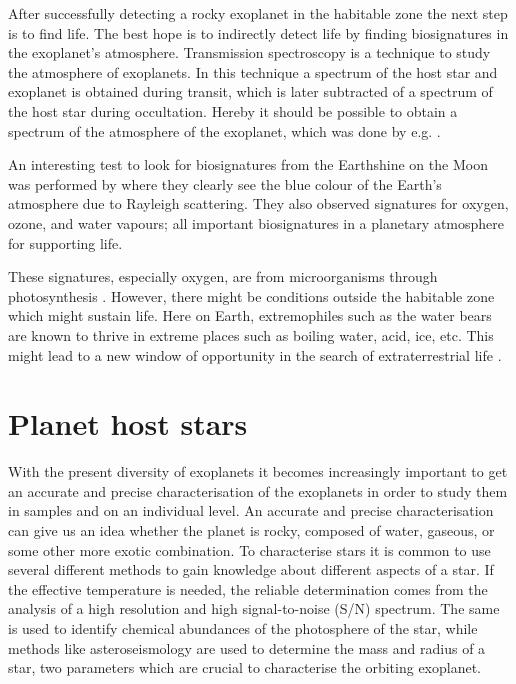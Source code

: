 After successfully detecting a rocky exoplanet in the habitable zone the next step is to find life.
The best hope is to indirectly detect life by finding biosignatures \citep{Kasting2002} in the
exoplanet's atmosphere. Transmission spectroscopy is a technique to study the atmosphere of
exoplanets. In this technique a spectrum of the host star and exoplanet is obtained during transit,
which is later subtracted of a spectrum of the host star during occultation. Hereby it should be
possible to obtain a spectrum of the atmosphere of the exoplanet, which was done by e.g.
\citet{Charbonneau2002}.

An interesting test to look for biosignatures from the Earthshine on the Moon was performed by
\citet{Arnold2002} where they clearly see the blue colour of the Earth's atmosphere due to Rayleigh
scattering. They also observed signatures for oxygen, ozone, and water vapours; all important
biosignatures in a planetary atmosphere for supporting life.

These signatures, especially oxygen, are from microorganisms through photosynthesis
\citep[see e.g.][]{Kasting2002}. However, there might be conditions outside the habitable zone which
might sustain life. Here on Earth, extremophiles such as the water bears are known to thrive in
extreme places such as boiling water, acid, ice, etc. This might lead to a new window of opportunity
in the search of extraterrestrial life \citep{Cavicchioli2002}.



\section{Planet host stars}
\label{sec:planet_host_stars}

With the present diversity of exoplanets it becomes increasingly important to get an accurate and
precise characterisation of the exoplanets in order to study them in samples and on an individual
level. An accurate and precise characterisation can give us an idea whether the planet is rocky,
composed of water, gaseous, or some other more exotic combination. To characterise stars it is
common to use several different methods to gain knowledge about different aspects of a star. If the
effective temperature is needed, the reliable determination comes from the analysis of a high
resolution and high signal-to-noise (S/N) spectrum. The same is used to identify chemical abundances
of the photosphere of the star, while methods like asteroseismology are used to determine the mass
and radius of a star, two parameters which are crucial to characterise the orbiting exoplanet.

